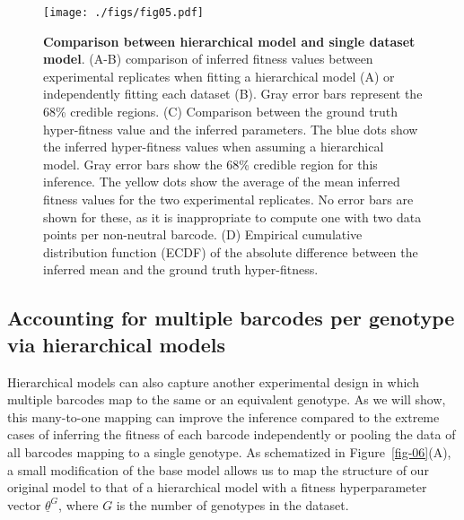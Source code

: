 \documentclass[
  letterpaper,
  DIV=11,
  numbers=noendperiod]{scrartcl}
\begin{document}
\begin{refsegment}
\begin{figure}
{\centering \texttt{[image: ./figs/fig05.pdf]}

}

\caption{\label{fig-05}\textbf{Comparison between hierarchical model and
single dataset model}. (A-B) comparison of inferred fitness values
between experimental replicates when fitting a hierarchical model (A) or
independently fitting each dataset (B). Gray error bars represent the
68\% credible regions. (C) Comparison between the ground truth
hyper-fitness value and the inferred parameters. The blue dots show the
inferred hyper-fitness values when assuming a hierarchical model. Gray
error bars show the 68\% credible region for this inference. The yellow
dots show the average of the mean inferred fitness values for the two
experimental replicates. No error bars are shown for these, as it is
inappropriate to compute one with two data points per non-neutral
barcode. (D) Empirical cumulative distribution function (ECDF) of the
absolute difference between the inferred mean and the ground truth
hyper-fitness.}

\end{figure}

\hypertarget{sec-genotypes}{%
\subsection{Accounting for multiple barcodes per genotype via
hierarchical models}\label{sec-genotypes}}

Hierarchical models can also capture another experimental design in
which multiple barcodes map to the same or an equivalent genotype. As we
will show, this many-to-one mapping can improve the inference compared
to the extreme cases of inferring the fitness of each barcode
independently or pooling the data of all barcodes mapping to a single
genotype. As schematized in Figure~\ref{fig-06}(A), a small modification
of the base model allows us to map the structure of our original model
to that of a hierarchical model with a fitness hyperparameter vector
\(\underline{\theta}^G\), where \(G\) is the number of genotypes in the
dataset.


\end{refsegment}
\end{document}

